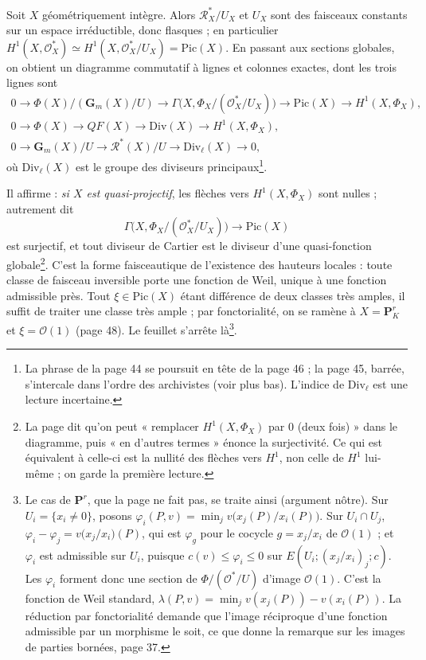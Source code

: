 \documentclass[11pt,a4paper]{article}
\begin{document}
Soit $X$ géométriquement intègre. Alors $\mathcal{R}^*_X/U_X$ et $U_X$ sont
des faisceaux constants sur un espace irréductible, donc flasques ; en
particulier $H^1(X, \mathcal{O}_X^*) \simeq H^1(X, \mathcal{O}_X^*/U_X) =
\mathrm{Pic}(X)$. En passant aux sections globales, on obtient un diagramme
commutatif à lignes et colonnes exactes, dont les trois lignes sont
\[
  \begin{array}{l}
  0 \to \Phi(X)/(\mathbf{G}_m(X)/U) \to \Gamma\bigl(X, \Phi_X/(\mathcal{O}_X^*/U_X)\bigr)
    \to \mathrm{Pic}(X) \to H^1(X, \Phi_X), \\[2pt]
  0 \to \Phi(X) \to QF(X) \to \mathrm{Div}(X) \to H^1(X, \Phi_X), \\[2pt]
  0 \to \mathbf{G}_m(X)/U \to \mathcal{R}^*(X)/U \to \mathrm{Div}_\ell(X) \to 0,
  \end{array}
\]
où $\mathrm{Div}_\ell(X)$ est le groupe des diviseurs principaux\footnote{La
phrase de la page 44 se poursuit en tête de la page 46 ; la page 45, barrée,
s'intercale dans l'ordre des archivistes (voir plus bas). L'indice de
$\mathrm{Div}_\ell$ est une lecture incertaine.}.

Il affirme : \emph{si $X$ est quasi-projectif}, les flèches vers
$H^1(X, \Phi_X)$ sont nulles ; autrement dit
\[
  \Gamma\bigl(X, \Phi_X/(\mathcal{O}_X^*/U_X)\bigr) \longrightarrow
  \mathrm{Pic}(X)
\]
est surjectif, et tout diviseur de Cartier est le diviseur d'une
quasi-fonction globale\footnote{La page dit qu'on peut « remplacer
$H^1(X, \Phi_X)$ par $0$ (deux fois) » dans le diagramme, puis
« en d'autres termes » énonce la surjectivité. Ce qui est équivalent à
celle-ci est la nullité des flèches vers $H^1$, non celle de $H^1$
lui-même ; on garde la première lecture.}. C'est la forme faisceautique de
l'existence des hauteurs locales : toute classe de faisceau inversible
porte une fonction de Weil, unique à une fonction admissible près. Tout
$\xi \in \mathrm{Pic}(X)$ étant différence de deux classes très amples, il
suffit de traiter une classe très ample ; par fonctorialité, on se ramène à
$X = \mathbf{P}^r_K$ et $\xi = \mathcal{O}(1)$ (page 48). Le feuillet
s'arrête là\footnote{Le cas de $\mathbf{P}^r$, que la page ne fait pas, se
traite ainsi (argument nôtre). Sur $U_i = \{x_i \neq 0\}$, posons
$\varphi_i(P, v) = \min_j v\bigl(x_j(P)/x_i(P)\bigr)$. Sur $U_i \cap U_j$,
$\varphi_i - \varphi_j = v\bigl(x_j/x_i\bigr)(P)$, qui est $\varphi_g$ pour
le cocycle $g = x_j/x_i$ de $\mathcal{O}(1)$ ; et $\varphi_i$ est
admissible sur $U_i$, puisque $c(v) \leqslant \varphi_i \leqslant 0$ sur
$E(U_i; (x_j/x_i)_j; c)$. Les $\varphi_i$ forment donc une section de
$\Phi/(\mathcal{O}^*/U)$ d'image $\mathcal{O}(1)$. C'est la fonction de Weil
standard, $\lambda(P, v) = \min_j v(x_j(P)) - v(x_i(P))$. La réduction par
fonctorialité demande que l'image réciproque d'une fonction admissible par
un morphisme le soit, ce que donne la remarque sur les images de parties
bornées, page 37.}.
\end{document}
